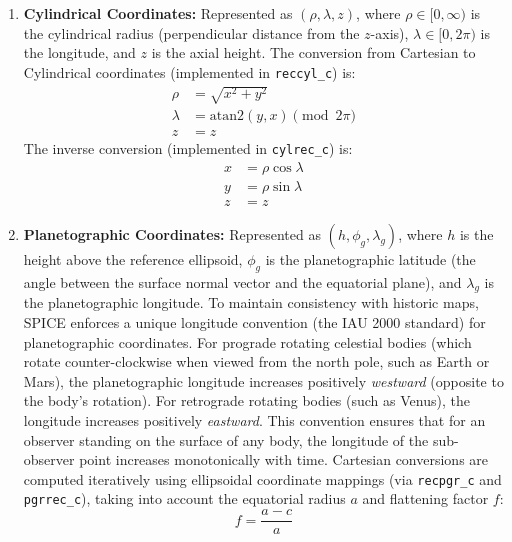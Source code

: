 \documentclass{acta}
\begin{document}
\begin{enumerate}
\item {\bf Cylindrical Coordinates:} Represented as $(\rho, \lambda, z)$, where $\rho \in [0, \infty)$ is the cylindrical radius (perpendicular distance from the $z$-axis), $\lambda \in [0, 2\pi)$ is the longitude, and $z$ is the axial height.
The conversion from Cartesian to Cylindrical coordinates (implemented in {\tt reccyl\_c}) is:
\begin{align}
\rho &= \sqrt{x^2 + y^2} \\
\lambda &= \text{atan2}(y, x) \pmod{2\pi} \\
z &= z
\end{align}
The inverse conversion (implemented in {\tt cylrec\_c}) is:
\begin{align}
x &= \rho \cos\lambda \\
y &= \rho \sin\lambda \\
z &= z
\end{align}

\item {\bf Planetographic Coordinates:} Represented as $(h, \phi_g, \lambda_g)$, where $h$ is the height above the reference ellipsoid, $\phi_g$ is the planetographic latitude (the angle between the surface normal vector and the equatorial plane), and $\lambda_g$ is the planetographic longitude.
To maintain consistency with historic maps, SPICE enforces a unique longitude convention (the IAU 2000 standard) for planetographic coordinates. For prograde rotating celestial bodies (which rotate counter-clockwise when viewed from the north pole, such as Earth or Mars), the planetographic longitude increases positively {\it westward} (opposite to the body's rotation). For retrograde rotating bodies (such as Venus), the longitude increases positively {\it eastward}. This convention ensures that for an observer standing on the surface of any body, the longitude of the sub-observer point increases monotonically with time. Cartesian conversions are computed iteratively using ellipsoidal coordinate mappings (via {\tt recpgr\_c} and {\tt pgrrec\_c}), taking into account the equatorial radius $a$ and flattening factor $f$:
\begin{equation}
f = \frac{a - c}{a}
\end{equation}
\end{enumerate}
\end{document}
